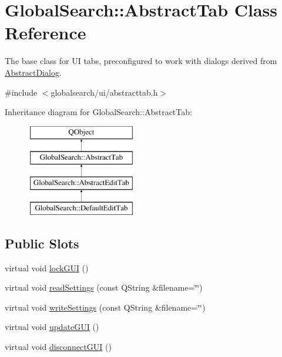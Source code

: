 \hypertarget{classGlobalSearch_1_1AbstractTab}{\section{Global\-Search\-:\-:Abstract\-Tab Class Reference}
\label{classGlobalSearch_1_1AbstractTab}
}


The base class for U\-I tabs, preconfigured to work with dialogs derived from \hyperlink{classGlobalSearch_1_1AbstractDialog}{Abstract\-Dialog}.  




{\ttfamily \#include $<$globalsearch/ui/abstracttab.\-h$>$}

Inheritance diagram for Global\-Search\-:\-:Abstract\-Tab\-:\begin{figure}[H]
\begin{center}
\leavevmode
\includegraphics[height=4.000000cm]{classGlobalSearch_1_1AbstractTab}
\end{center}
\end{figure}
\subsection*{Public Slots}
\begin{DoxyCompactItemize}
\item 
virtual void \hyperlink{classGlobalSearch_1_1AbstractTab_a82adaa8137d80906a35beebe92944a3e}{lock\-G\-U\-I} ()
\item 
virtual void \hyperlink{classGlobalSearch_1_1AbstractTab_adc4ad2d0853e7db17a0b147857304cba}{read\-Settings} (const Q\-String \&filename=\char`\"{}\char`\"{})
\item 
virtual void \hyperlink{classGlobalSearch_1_1AbstractTab_a5b09ac7389e664c60ee5ab11a1f8d8fd}{write\-Settings} (const Q\-String \&filename=\char`\"{}\char`\"{})
\item 
virtual void \hyperlink{classGlobalSearch_1_1AbstractTab_a35194ae3ff3b875c1f2e886a69555050}{update\-G\-U\-I} ()
\item 
virtual void \hyperlink{classGlobalSearch_1_1AbstractTab_a63ec89943d1e740fd162877c7cb3679a}{disconnect\-G\-U\-I} ()
\end{DoxyCompactItemize}
